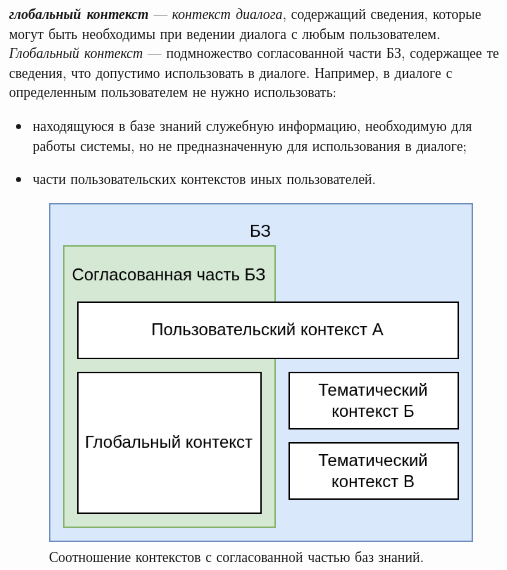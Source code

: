 \textit{\textbf{глобальный контекст}} --- \textit{контекст диалога}, содержащий сведения, которые могут быть необходимы при ведении диалога с любым пользователем.
    \textit{Глобальный контекст} --- подмножество согласованной части БЗ, содержащее те сведения, что допустимо использовать в диалоге.
Например, в диалоге с определенным пользователем не нужно использовать:
\begin{itemize}
    \item находящуюся в базе знаний служебную информацию, необходимую для работы системы, но не предназначенную для использования в диалоге;
    \item части пользовательских контекстов иных пользователей.
\end{itemize}

\begin{figure}[h]
    \centering
    \includegraphics[scale=0.3]{images/part4/chapter_nl_interfaces/context_in_KB}
    \caption{Соотношение контекстов с согласованной частью баз знаний.}
    \label{fig:context_in_KB}
\end{figure}

\begin{SCn}

    \begin{scnindent}
        \begin{scneqtoset}
        \end{scneqtoset}
    \end{scnindent}

\end{SCn}

